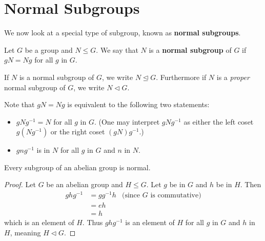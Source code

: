 \section{Normal Subgroups}
We now look at a special type of subgroup, known as \textbf{normal subgroups}.
\begin{definition}
    Let $G$ be a group and $N \leq G$. We say that $N$ is a \textbf{normal subgroup} of $G$ if $gN = Ng$ for all $g$ in $G$.
\end{definition}
If $N$ is a normal subgroup of $G$, we write $N \unlhd G$. Furthermore if $N$ is a \textit{proper} normal subgroup of $G$, we write $N \lhd G$.

Note that $gN = Ng$ is equivalent to the following two statements:
\begin{itemize}
    \item $gNg^{-1} = N$ for all $g$ in $G$. (One may interpret $gNg^{-1}$ as either the left coset $g(Ng^{-1})$ or the right coset $(gN)g^{-1}$.)
    \item $gng^{-1}$ is in $N$ for all $g$ in $G$ and $n$ in $N$.
\end{itemize}

\newpage

\begin{proposition}\label{prop-subgroup-of-abelian-group-is-normal}
    Every subgroup of an abelian group is normal.
\end{proposition}
\begin{proof}
    Let $G$ be an abelian group and $H \leq G$. Let $g$ be in $G$ and $h$ be in $H$. Then
    \begin{align*}
        ghg^{-1} &= gg^{-1}h & \text{(since }G \text{ is commutative)}\\
        &= eh\\
        &= h
    \end{align*}
    which is an element of $H$. Thus $ghg^{-1}$ is an element of $H$ for all $g$ in $G$ and $h$ in $H$, meaning $H \lhd G$.
\end{proof}


